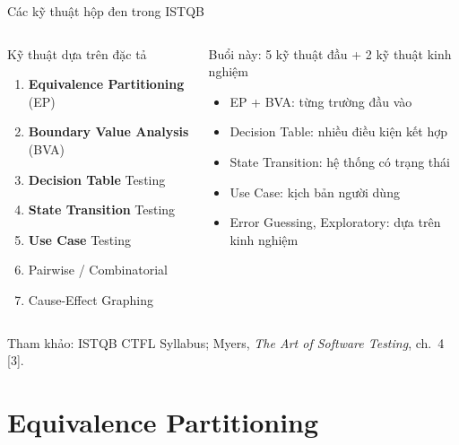 \documentclass[aspectratio=169,12pt]{beamer}
\begin{document}
\begin{frame}[shrink=10]{Các kỹ thuật hộp đen trong ISTQB}
  \begin{columns}
    \begin{block}{Kỹ thuật dựa trên đặc tả}
      \begin{enumerate}
        \item \textbf{Equivalence Partitioning} (EP)
        \item \textbf{Boundary Value Analysis} (BVA)
        \item \textbf{Decision Table} Testing
        \item \textbf{State Transition} Testing
        \item \textbf{Use Case} Testing
        \item Pairwise / Combinatorial
        \item Cause-Effect Graphing
      \end{enumerate}
    \end{block}

    \begin{block}{Buổi này: 5 kỹ thuật đầu + 2 kỹ thuật kinh nghiệm}
      \begin{itemize}
        \item EP + BVA: từng trường đầu vào
        \item Decision Table: nhiều điều kiện kết hợp
        \item State Transition: hệ thống có trạng thái
        \item Use Case: kịch bản người dùng
        \item Error Guessing, Exploratory: dựa trên kinh nghiệm
      \end{itemize}
    \end{block}
  \end{columns}

  \vspace{0.2em}
  {\scriptsize Tham khảo: ISTQB CTFL Syllabus; Myers, \textit{The Art of Software Testing}, ch.~4 [3].}
\end{frame}

\section{Equivalence Partitioning}
\end{document}
